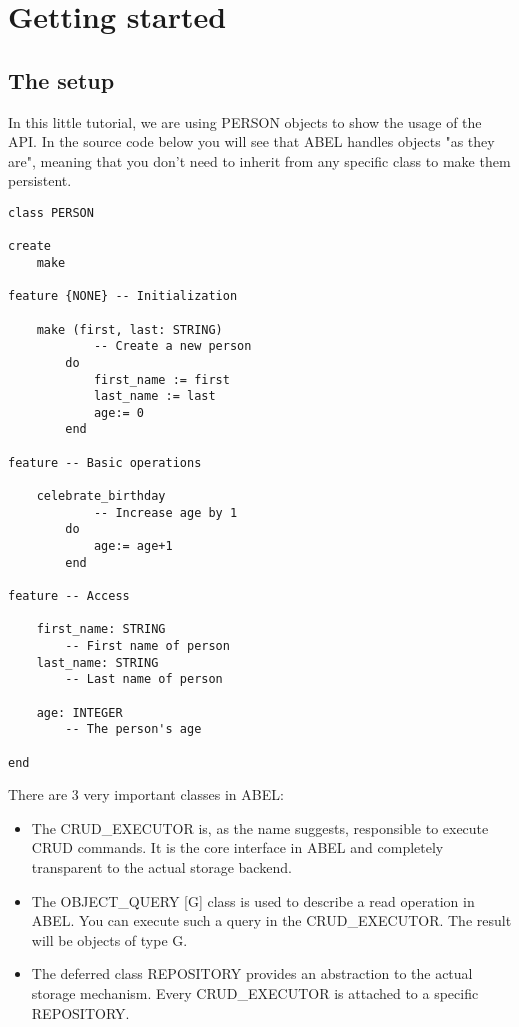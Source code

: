 
\section{Getting started}

\subsection{The setup}
In this little tutorial, we are using PERSON objects to show the usage of the API.
In the source code below you will see that ABEL handles objects "as they are", meaning that you don't need to inherit from any specific class to make them persistent.

\begin{lstlisting}[language=OOSC2Eiffel, captionpos=b, caption={The PERSON class}, label={lst:person_class}]
class PERSON

create
	make

feature {NONE} -- Initialization

	make (first, last: STRING)
			-- Create a new person
		do
			first_name := first
			last_name := last
			age:= 0
		end

feature -- Basic operations

	celebrate_birthday
			-- Increase age by 1
		do
			age:= age+1
		end

feature -- Access

	first_name: STRING
		-- First name of person
	last_name: STRING
		-- Last name of person

	age: INTEGER
		-- The person's age

end

\end{lstlisting}




There are 3 very important classes in ABEL:
\begin{itemize}
 \item The CRUD\_EXECUTOR is, as the name suggests, responsible to execute CRUD commands.
	It is the core interface in ABEL and completely transparent to the actual storage backend.

 \item The OBJECT\_QUERY [G] class is used to describe a read operation in ABEL. 
	You can execute such a query in the CRUD\_EXECUTOR. 
	The result will be objects of type G.

 \item The deferred class REPOSITORY provides an abstraction to the actual storage mechanism.
	Every CRUD\_EXECUTOR is attached to a specific REPOSITORY.
\end{itemize}

